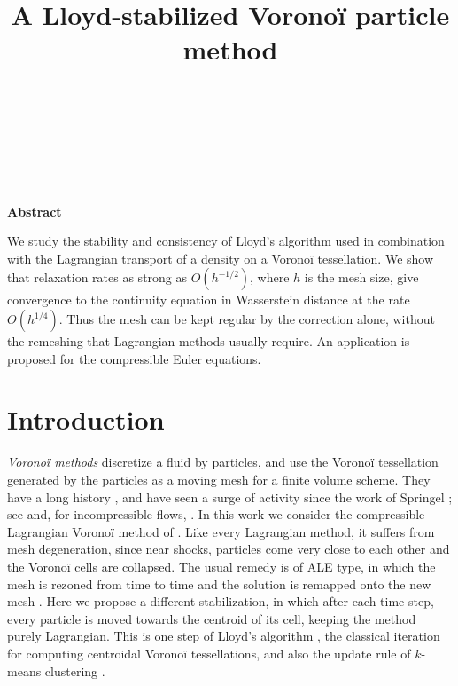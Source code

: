 \documentclass[letterpaper,11pt,twoside]{article}
\title{A Lloyd-stabilized Vorono\"i particle method}
\author{%
\CPAMauthor{BRUNO DESPR\'ES}\\[-1pt]
\CPAMaffiliation{Laboratoire Jacques-Louis Lions}\\[0.7em]
\CPAMand\\[0.7em]
\CPAMauthor{BORJAN GESHKOVSKI}\\[-1pt]
\CPAMaffiliation{Laboratoire Jacques-Louis Lions}%
}
\date{}
\makeatletter
\numberwithin{figure}{section}
\numberwithin{table}{section}
\theoremstyle{cpamplain}
\theoremstyle{cpamdefinition}
\renewcommand{\maketitle}{%
  \thispagestyle{cpamfirst}%
  \begingroup
  \centering
  \vspace*{0.56in}%
  {\Large\bfseries\@title\par}%
  \vspace{0.35in}%
  {\normalsize\@author\par}%
  \vspace{0.28in}%
  \endgroup
}
\renewenvironment{abstract}{%
  \begin{center}\bfseries Abstract\end{center}%
  \small
  \begin{list}{}{\leftmargin=0.55in\rightmargin=0.55in}%
  \item\relax
}{%
  \end{list}\normalsize
}
\numberwithin{equation}{section}
\makeatother
\begin{document}

%
%

\maketitle

%
%

\begin{abstract}
We study the stability and consistency of Lloyd's algorithm used in combination with the Lagrangian transport of a density on a Vorono\"i tessellation.
We show that relaxation rates as strong as $O(h^{-1/2})$, where $h$ is the mesh size, give convergence to the continuity equation in Wasserstein distance at the rate $O(h^{1/4})$. Thus the mesh can be kept regular by the correction alone, without the remeshing that Lagrangian methods usually require. An application is proposed for the compressible Euler equations.
\end{abstract}

\thispagestyle{cpamfirst}

\section{Introduction}

\emph{Vorono\"i methods} discretize a fluid by particles, and use the Vorono\"i tessellation generated by the particles as a moving mesh for a finite volume scheme. They have a long history \cite{pasta,RUSSO199384,PhysRevLett.83.1775,DEVILLERS1996315}, and have seen a surge of activity since the work of Springel \cite{Springel2010}; see \cite{shasha,loulou,DUQUE2023268,DECAMPOS2022114680,GABURRO2020109167} and, for incompressible flows, \cite{kincl}. In this work we consider the compressible Lagrangian Vorono\"i method of \cite{despres2024,desprem}. Like every Lagrangian method, it suffers from mesh degeneration, since near shocks, particles come very close to each other and the Vorono\"i cells are collapsed. The usual remedy is of ALE type, in which the mesh is rezoned from time to time and the solution is remapped onto the new mesh \cite{loulou,kincl}. Here we propose a different stabilization, in which after each time step, every particle is moved towards the centroid of its cell, keeping the method purely Lagrangian. This is one step of Lloyd's algorithm \cite{Lloyd1982}, the classical iteration for computing centroidal Vorono\"i tessellations, and also the update rule of $k$-means clustering \cite{MacQueen1967}.
\end{document}
